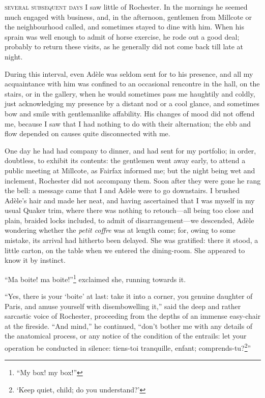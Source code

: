 
 \textsc{several subsequent days} I saw little of \Mr{} Rochester. In the
mornings he seemed much engaged with business, and, in the afternoon,
gentlemen from Millcote or the neighbourhood called, and sometimes
stayed to dine with him. When his sprain was well enough to admit of
horse exercise, he rode out a good deal; probably to return these
visits, as he generally did not come back till late at night.

During this interval, even Adèle was seldom sent for to his presence,
and all my acquaintance with him was confined to an occasional rencontre
in the hall, on the stairs, or in the gallery, when he would sometimes
pass me haughtily and coldly, just acknowledging my presence by a
distant nod or a cool glance, and sometimes bow and smile with
gentlemanlike affability. His changes of mood did not offend me,
because I saw that I had nothing to do with their alternation; the ebb
and flow depended on causes quite disconnected with me.

One day he had had company to dinner, and had sent for my portfolio; in
order, doubtless, to exhibit its contents: the gentlemen went away
early, to attend a public meeting at Millcote, as \Mrs{} Fairfax informed
me; but the night being wet and inclement, \Mr{} Rochester did not
accompany them. Soon after they were gone he rang the bell: a message
came that I and Adèle were to go downstairs. I brushed Adèle's hair and
made her neat, and having ascertained that I was myself in my usual
Quaker trim, where there was nothing to retouch---all being too close
and plain, braided locks included, to admit of disarrangement---we
descended, Adèle wondering whether the \foreignlanguage{french}{\emph{petit coffre}} was at length
come; for, owing to some mistake, its arrival had hitherto been
delayed. She was gratified: there it stood, a little carton, on the
table when we entered the dining-room. She appeared to know it by
instinct.

\foreignquote{french}{Ma boite! ma boite!}\footnote{\enquote{My box! my box!}} exclaimed she, running towards it.

\enquote{Yes, there is your \foreignquote{french}{boite} at last: take it into a
corner, you genuine daughter of Paris, and amuse yourself with
disembowelling it,} said the deep and rather sarcastic voice of \Mr{}
 Rochester, proceeding from the depths of an immense easy-chair at the
fireside. \enquote{And mind,} he continued, \enquote{don't bother me
with any details of the anatomical process, or any notice of the
condition of the entrails: let your operation be conducted in silence:
\foreignlanguage{french}{tiens-toi tranquille, enfant; comprends-tu?}\footnote{\enquote{Keep quiet, child; do you understand?}}}

